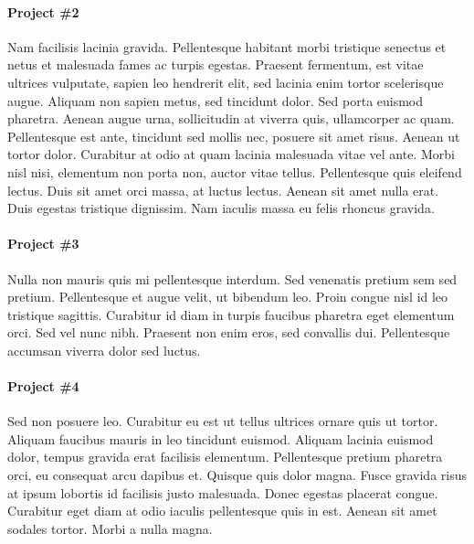 \documentclass[letterpaper,11pt]{article}
\begin{document}
\paragraph{Project \#2}
Nam facilisis lacinia gravida. Pellentesque habitant morbi tristique
senectus et netus et malesuada fames ac turpis egestas. Praesent
fermentum, est vitae ultrices vulputate, sapien leo hendrerit elit,
sed lacinia enim tortor scelerisque augue. Aliquam non sapien metus,
sed tincidunt dolor. Sed porta euismod pharetra. Aenean augue urna,
sollicitudin at viverra quis, ullamcorper ac quam. Pellentesque est
ante, tincidunt sed mollis nec, posuere sit amet risus. Aenean ut
tortor dolor. Curabitur at odio at quam lacinia malesuada vitae vel
ante. Morbi nisl nisi, elementum non porta non, auctor vitae tellus.
Pellentesque quis eleifend lectus. Duis sit amet orci massa, at luctus
lectus. Aenean sit amet nulla erat. Duis egestas tristique dignissim.
Nam iaculis massa eu felis rhoncus gravida.

\paragraph{Project \#3}
Nulla non mauris quis mi pellentesque interdum. Sed venenatis pretium
sem sed pretium. Pellentesque et augue velit, ut bibendum leo. Proin
congue nisl id leo tristique sagittis. Curabitur id diam in turpis
faucibus pharetra eget elementum orci. Sed vel nunc nibh. Praesent non
enim eros, sed convallis dui. Pellentesque accumsan viverra dolor sed
luctus.

\paragraph{Project \#4}
Sed non posuere leo. Curabitur eu est ut tellus ultrices ornare quis
ut tortor. Aliquam faucibus mauris in leo tincidunt euismod. Aliquam
lacinia euismod dolor, tempus gravida erat facilisis elementum.
Pellentesque pretium pharetra orci, eu consequat arcu dapibus et.
Quisque quis dolor magna. Fusce gravida risus at ipsum lobortis id
facilisis justo malesuada. Donec egestas placerat congue. Curabitur
eget diam at odio iaculis pellentesque quis in est. Aenean sit amet
sodales tortor. Morbi a nulla magna.
\end{document}
